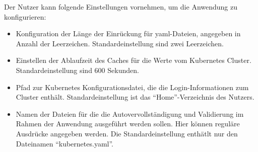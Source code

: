 Der Nutzer kann folgende Einstellungen vornehmen, um die Anwendung
zu konfigurieren:
\begin{itemize}
  \setlength\itemsep{-0.5cm}
  \item Konfiguration der Länge der Einrückung für \ac{yaml}-Dateien, angegeben in Anzahl der Leerzeichen. Standardeinstellung sind zwei Leerzeichen.
  \item Einstellen der Ablaufzeit des Caches für die Werte vom Kubernetes Cluster. Standardeinstellung sind 600 Sekunden.
  \item Pfad zur Kubernetes Konfigurationsdatei, die die Login-Informationen zum Cluster enthält. Standardeinstellung ist das ``Home''-Verzeichnis des Nutzers.
  \item Namen der Dateien für die die Autovervollständigung und Validierung im Rahmen der Anwendung ausgeführt werden sollen.
        Hier können reguläre Ausdrücke angegeben werden. Die Standardeinstellung enthätlt nur den Dateinamen ``kubernetes.yaml''.
\end{itemize}